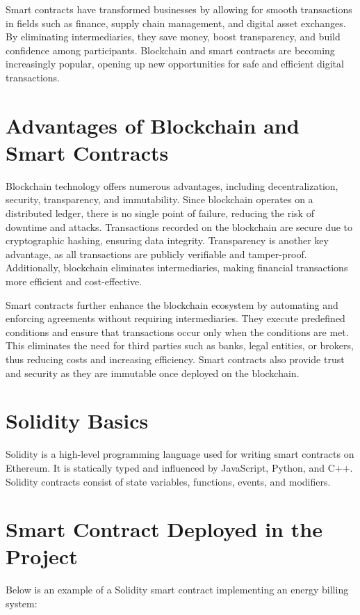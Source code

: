 \documentclass[a4paper,12pt]{report}
\begin{document}
 Smart contracts have transformed businesses by allowing for smooth transactions in fields such as finance, supply chain management, and digital asset exchanges.  By eliminating intermediaries, they save money, boost transparency, and build confidence among participants\cite{johari2021smart}.  Blockchain and smart contracts are becoming increasingly popular, opening up new opportunities for safe and efficient digital transactions.



 \section{Advantages of Blockchain and Smart Contracts}
 Blockchain technology offers numerous advantages, including decentralization, security, transparency, and immutability. Since blockchain operates on a distributed ledger, there is no single point of failure, reducing the risk of downtime and attacks. Transactions recorded on the blockchain are secure due to cryptographic hashing, ensuring data integrity. Transparency is another key advantage, as all transactions are publicly verifiable and tamper-proof. Additionally, blockchain eliminates intermediaries, making financial transactions more efficient and cost-effective.
 
 Smart contracts further enhance the blockchain ecosystem by automating and enforcing agreements without requiring intermediaries. They execute predefined conditions and ensure that transactions occur only when the conditions are met. This eliminates the need for third parties such as banks, legal entities, or brokers, thus reducing costs and increasing efficiency. Smart contracts also provide trust and security as they are immutable once deployed on the blockchain.
 
 \section{Solidity Basics}
 Solidity is a high-level programming language used for writing smart contracts on Ethereum. It is statically typed and influenced by JavaScript, Python, and C++. Solidity contracts consist of state variables, functions, events, and modifiers. 
 
 \section{Smart Contract Deployed in the Project}
 Below is an example of a Solidity smart contract implementing an energy billing system:
 
\end{document}

